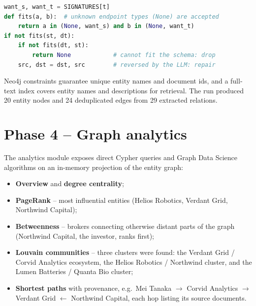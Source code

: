 \documentclass[11pt,a4paper]{report}
\begin{document}
\begin{lstlisting}[language=Python, caption={Schema validation with direction repair (shared by Spark and the evaluator).}]
want_s, want_t = SIGNATURES[t]
def fits(a, b):  # unknown endpoint types (None) are accepted
    return a in (None, want_s) and b in (None, want_t)
if not fits(st, dt):
    if not fits(dt, st):
        return None            # cannot fit the schema: drop
    src, dst = dst, src        # reversed by the LLM: repair
\end{lstlisting}

Neo4j constraints guarantee unique entity names and document ids, and a full-text index covers entity names and
descriptions for retrieval. The run produced 20 entity nodes and 24 deduplicated edges from 29 extracted relations.

\section{Phase 4 -- Graph analytics}
The analytics module exposes direct Cypher queries and Graph Data Science algorithms on an in-memory projection of
the entity graph:
\begin{itemize}
  \item \textbf{Overview} and \textbf{degree centrality};
  \item \textbf{PageRank} -- most influential entities (Helios Robotics, Verdant Grid, Northwind Capital);
  \item \textbf{Betweenness} -- brokers connecting otherwise distant parts of the graph (Northwind Capital, the
        investor, ranks first);
  \item \textbf{Louvain communities} -- three clusters were found: the Verdant Grid / Corvid Analytics ecosystem, the
        Helios Robotics / Northwind cluster, and the Lumen Batteries / Quanta Bio cluster;
  \item \textbf{Shortest paths} with provenance, e.g.\ Mei Tanaka $\to$ Corvid Analytics $\to$ Verdant Grid
        $\leftarrow$ Northwind Capital, each hop listing its source documents.
\end{itemize}
\end{document}
